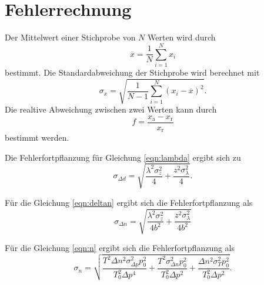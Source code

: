 \section{Fehlerrechnung}

Der Mittelwert einer Stichprobe von $N$ Werten wird durch
\begin{equation}
    \overline{x} = \frac{1}{N} \sum_{i=1}^N x_i
    \label{eqn:mittelwert}
\end{equation}
bestimmt.
\newline
Die Standardabweichung der Stichprobe wird berechnet mit
\begin{equation*}
    \sigma_x = \sqrt{\frac{1}{N-1} \sum_{i=1}^N (x_i - \overline{x})^2}.
    \label{eqn:standard}
\end{equation*}
\newline
Die realtive Abweichung zwischen zwei Werten kann durch
\begin{equation*}
    f = \frac{x_\text{a} - x_\text{r}}{x_\text{r}}
\end{equation*}
bestimmt werden.
\newline

Die Fehlerfortpflanzung für Gleichung \eqref{eqn:lambda} ergibt sich zu 
\begin{equation}
    \sigma_{\Delta d} = \sqrt{\frac{\lambda^{2} \sigma_{z}^{2}}{4} + \frac{z^{2} \sigma_{\lambda}^{2}}{4}}.
    \label{eqn:errlambda}
\end{equation}

Für die Gleichung \eqref{eqn:deltan} ergibt sich die Fehlerfortpflanzung als 
\begin{equation}
    \sigma_{\Delta n} =\sqrt{\frac{\lambda^{2} \sigma_{z}^{2}}{4 b^{2}} + \frac{z^{2} \sigma_{\lambda}^{2}}{4 b^{2}}}
    \label{eqn:errdeltan}
\end{equation}

Für die Gleichung \eqref{eqn:n} ergibt sich die Fehlerfortpflanzung als 
\begin{equation}
    \sigma_{n} =  \sqrt{\frac{T^{2} \Delta n^{2} \sigma_{\Delta p}^{2} p_{0}^{2}}{T_{0}^{2} \Delta p^{4}} + \frac{T^{2} \sigma_{\Delta n}^{2} p_{0}^{2}}{T_{0}^{2} \Delta p^{2}} + \frac{\Delta n^{2} \sigma_{T}^{2} p_{0}^{2}}{T_{0}^{2} \Delta p^{2}}}.
\label{eqn:errn}
\end{equation}
